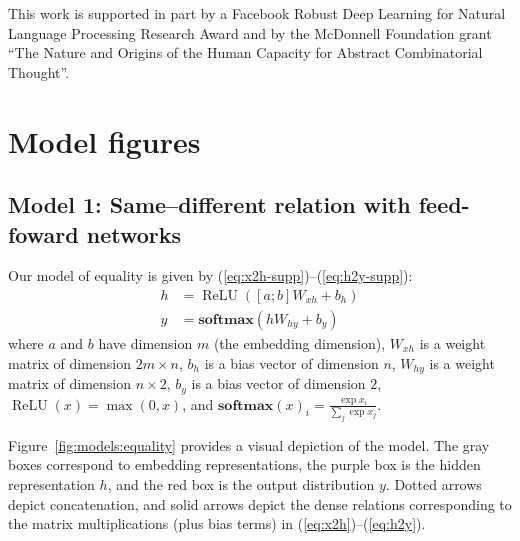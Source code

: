 \documentclass{article}
\newcommand{\Figref}[1]{Figure~\ref{#1}}
\newcommand{\eg}[1]{(\ref{#1})}
\newcommand{\dasheg}[2]{\eg{#1}--\eg{#2}}
\newcommand{\softmax}{\mathbf{softmax}}
\DeclareMathOperator{\ReLU}{ReLU}
\begin{document}
This work is supported in part by a Facebook Robust Deep Learning for Natural Language Processing Research Award and by the McDonnell Foundation grant ``The Nature and Origins of the Human Capacity for Abstract Combinatorial Thought''.





\appendix

\section{Model figures}


\subsection{Model 1: Same--different relation with feed-foward  networks}\label{sec:model1}

Our model of equality is given by \dasheg{eq:x2h-supp}{eq:h2y-supp}:
%
\begin{align}
  h &= \ReLU([a;b]W_{xh} + b_{h}) \label{eq:x2h-supp}\\
  y &= \softmax(hW_{hy} + b_{y}) \label{eq:h2y-supp}
\end{align}
%
where $a$ and $b$ have dimension $m$ (the embedding dimension), $W_{xh}$ is a weight matrix of dimension $2m \times n$, $b_{h}$ is a bias vector of dimension $n$, $W_{hy}$ is a weight matrix of dimension $n \times 2$, $b_{y}$ is a bias vector of dimension $2$, $\ReLU(x) = \max(0, x)$, and $\softmax(x)_{i} = \frac{\exp{x_{i}}}{\sum_{j} \exp{x_{j}}}$.

\Figref{fig:models:equality} provides a visual depiction of the model. The gray boxes correspond to embedding representations, the purple box is the hidden representation $h$, and the red box is the output distribution $y$. Dotted arrows depict concatenation, and solid arrows depict the dense relations corresponding to the matrix multiplications (plus bias terms) in \dasheg{eq:x2h}{eq:h2y}.
\end{document}

